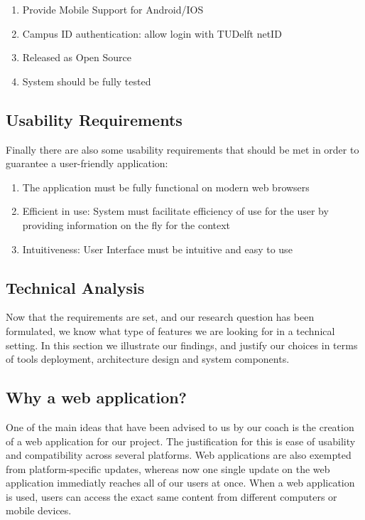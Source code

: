\begin{enumerate}
	\item Provide Mobile Support for Android/IOS
	\item Campus ID authentication: allow login with TUDelft netID
	\item Released as Open Source
 	\item System should be fully tested 
\end{enumerate}

\subsection{Usability Requirements} %

Finally there are also some usability requirements that should be met in order to guarantee a user-friendly application:

\label{sub:usability_requirements}
\begin{enumerate}
	\item The application must be fully functional on modern web browsers
	\item Efficient in use: System must facilitate efficiency of use for the user by providing information on the fly for the context
	\item Intuitiveness: User Interface must be intuitive and easy to use
\end{enumerate}

\subsection{Technical Analysis} %

Now that the requirements are set, and our research question has been formulated, we know what type of features we are looking for in a technical setting. In this section we illustrate our findings, and justify our choices in terms of tools deployment, architecture design and system components.

\subsection{Why a web application?}
One of the main ideas that have been advised to us by our coach is the creation of a web application for our project. The justification for this is ease of usability and compatibility across several platforms. Web applications are also exempted from platform-specific updates, whereas now one single update on the web application immediatly reaches all of our users at once. When a web application is used, users can access the exact same content from different computers or mobile devices.
\newpage
